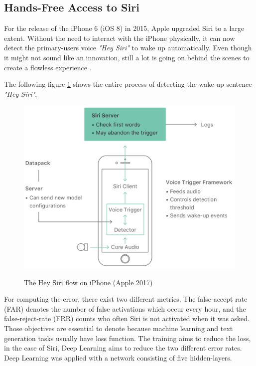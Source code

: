\subsection{Hands-Free Access to Siri}
For the release of the iPhone 6 (iOS 8) in 2015, Apple upgraded Siri to a large extent. Without the need to interact with the iPhone physically, it can now detect the primary-users voice \textit{"Hey Siri"} to wake up automatically. Even though it might not sound like an innovation, still a lot is going on behind the scenes to create a flowless experience \cite{siri1}. 

The following figure \ref{flow} shows the entire process of detecting the wake-up sentence \textit{"Hey Siri"}.

\begin{figure}
  \begin{center}
  \includegraphics[width=4.5in]{photos/HeySiriFlow-1}\\
  \caption{The Hey Siri flow on iPhone (Apple 2017) \cite{siri1}}\label{flow}
  \end{center}
\end{figure}

For computing the error, there exist two different metrics. The false-accept rate (FAR) denotes the number of false activations which occur every hour, and the false-reject-rate (FRR) counts who often Siri is not activated when it was asked. Those objectives are essential to denote because machine learning and text generation tasks usually have loss function. The training aims to reduce the loss, in the case of Siri, Deep Learning aims to reduce the two different error rates. 
Deep Learning was applied with a network consisting of five hidden-layers. 

